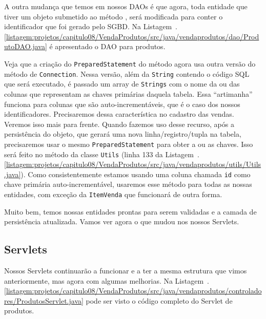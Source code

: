 
A outra mudança que temos em nossos DAOs é que agora, toda entidade que tiver um objeto submetido ao método , será modificada para conter o identificador que foi gerado pelo SGBD. Na Listagem~\thechapter.\ref{listagem:projetos/capitulo08/VendaProdutos/src/java/vendaprodutos/dao/ProdutoDAO.java} é apresentado o DAO para produtos.


Veja que a criação do \texttt{PreparedStatement} do método  agora usa outra versão do método  de \texttt{Connection}. Nessa versão, além da \texttt{String} contendo o código SQL que será executado, é passado um array de \texttt{Strings} com o nome da ou das colunas que representam as chaves primárias daquela tabela. Essa ``artimanha'' funciona para colunas que são auto-incrementáveis, que é o caso dos nossos identificadores. Precisaremos dessa característica no cadastro das vendas. Veremos isso mais para frente. Quando fazemos uso desse recurso, após a persistência do objeto, que gerará uma nova linha/registro/tupla na tabela, precisaremos usar o mesmo \texttt{PreparedStatement} para obter a ou as chaves. Isso será feito no método  da classe \texttt{Utils} (linha 133 da Listagem~\thechapter.\ref{listagem:projetos/capitulo08/VendaProdutos/src/java/vendaprodutos/utils/Utils.java}). Como consistentemente estamos usando uma coluna chamada \texttt{id} como chave primária auto-incrementável, usaremos esse método para todas as nossas entidades, com exceção da \texttt{ItemVenda} que funcionará de outra forma.

Muito bem, temos nossas entidades prontas para serem validadas e a camada de persistência atualizada. Vamos ver agora o que mudou nos nossos Servlets.


\subsection{Servlets}

Nossos Servlets continuarão a funcionar e a ter a mesma estrutura que vimos anteriormente, mas agora com algumas melhorias. Na Listagem~\thechapter.\ref{listagem:projetos/capitulo08/VendaProdutos/src/java/vendaprodutos/controladores/ProdutosServlet.java} pode ser visto o código completo do Servlet de produtos.

